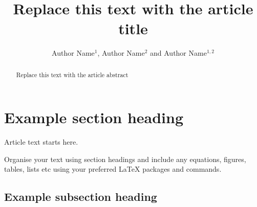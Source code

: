 \documentclass{iopconfser}
\begin{document}
\title{Replace this text with the article title}

\author{Author Name$^{1}$, Author Name$^{2}$ and Author Name$^{1,2}$}



\begin{abstract}
Replace this text with the article abstract
\end{abstract}

\section{Example section heading}
Article text starts here. 

Organise your text using section headings and include any equations, figures, tables, lists etc using your preferred LaTeX packages and commands.

\subsection{Example subsection heading}
\end{document}
